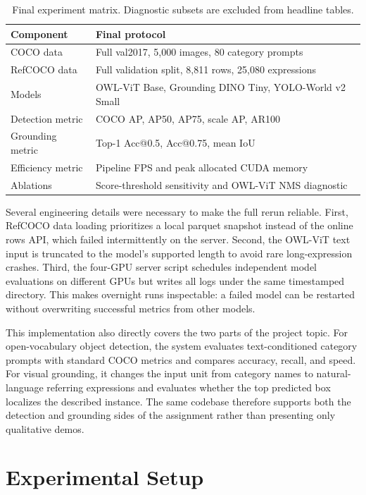 \documentclass[conference]{IEEEtran}
\begin{document}
\begin{table}[t]
\caption{Final experiment matrix. Diagnostic subsets are excluded from headline
tables.}
\label{tab:implementation}
\centering
\small
\begin{tabularx}{\columnwidth}{lY}
\toprule
Component & Final protocol \\
\midrule
COCO data & Full val2017, 5,000 images, 80 category prompts \\
RefCOCO data & Full validation split, 8,811 rows, 25,080 expressions \\
Models & OWL-ViT Base, Grounding DINO Tiny, YOLO-World v2 Small \\
Detection metric & COCO AP, AP50, AP75, scale AP, AR100 \\
Grounding metric & Top-1 Acc@0.5, Acc@0.75, mean IoU \\
Efficiency metric & Pipeline FPS and peak allocated CUDA memory \\
Ablations & Score-threshold sensitivity and OWL-ViT NMS diagnostic \\
\bottomrule
\end{tabularx}
\end{table}

Several engineering details were necessary to make the full rerun reliable.
First, RefCOCO data loading prioritizes a local parquet snapshot instead of the
online rows API, which failed intermittently on the server. Second, the
OWL-ViT text input is truncated to the model's supported length to avoid rare
long-expression crashes. Third, the four-GPU server script schedules independent
model evaluations on different GPUs but writes all logs under the same
timestamped directory. This makes overnight runs inspectable: a failed model
can be restarted without overwriting successful metrics from other models.

This implementation also directly covers the two parts of the project topic.
For open-vocabulary object detection, the system evaluates text-conditioned
category prompts with standard COCO metrics and compares accuracy, recall, and
speed. For visual grounding, it changes the input unit from category names to
natural-language referring expressions and evaluates whether the top predicted
box localizes the described instance. The same codebase therefore supports both
the detection and grounding sides of the assignment rather than presenting only
qualitative demos.

\section{Experimental Setup}
\end{document}
